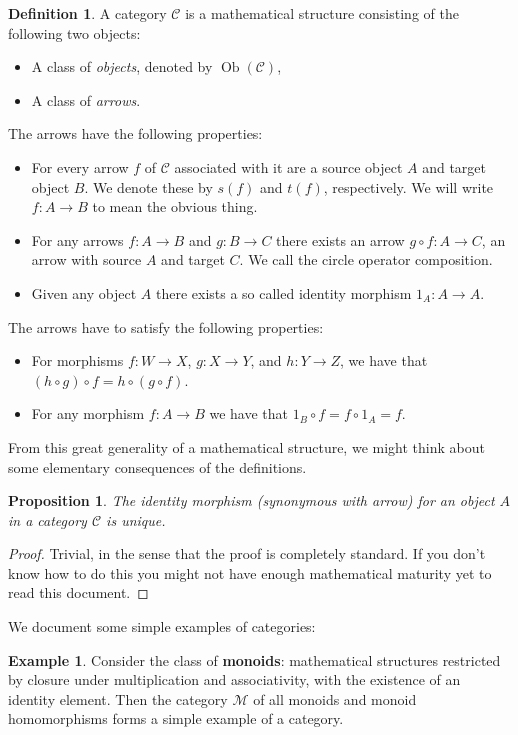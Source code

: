 \documentclass[12pt]{article}
\theoremstyle{plain}
\newtheorem{prop}{Proposition}
\theoremstyle{definition}
\newtheorem{defn}{Definition}
\newtheorem{example}{Example}
\newcommand{\Cc}{\mathcal{C}}
\newcommand{\Ob}{\operatorname{Ob}}
\begin{document}
\begin{defn}
A category $\Cc$ is a mathematical structure consisting of the following two objects:
\begin{itemize}
	\item A class of \textit{objects}, denoted by $\Ob(\Cc)$,
	\item A class of \textit{arrows}.
\end{itemize}

The arrows have the following properties:
\begin{itemize}
	\item For every arrow $f$ of $\Cc$ associated with it are a source object $A$ and target object $B$. We denote these by $s(f)$ and $t(f)$, respectively. We will write $f:A \to B$ to mean the obvious thing.
	\item For any arrows $f:A \to B$ and $g: B \to C$ there exists an arrow $g \circ f: A \to C$, an arrow with source $A$ and target $C$. We call the circle operator composition.
	\item Given any object $A$ there exists a so called identity morphism $1_A: A \to A$.
\end{itemize}

The arrows have to satisfy the following properties:
\begin{itemize}
	\item For morphisms $f:W \to X$, $g: X \to Y$, and $h: Y \to Z$, we have that $(h \circ g) \circ f = h \circ (g \circ f)$.
	\item For any morphism $f: A \to B$ we have that $1_B \circ f = f \circ 1_A = f$.
\end{itemize}
\end{defn}

From this great generality of a mathematical structure, we might think about some elementary consequences of the definitions.
\begin{prop}
	The identity morphism (synonymous with arrow) for an object $A$ in a category $\Cc$ is unique.
\end{prop}
\begin{proof}
Trivial, in the sense that the proof is completely standard. If you don't know how to do this you might not have enough mathematical maturity yet to read this document.
\end{proof}

We document some simple examples of categories:

\begin{example}
Consider the class of \textbf{monoids}: mathematical structures restricted by closure under multiplication and associativity, with the existence of an identity element. Then the category $\mathcal{M}$ of all monoids and monoid homomorphisms forms a simple example of a category.
\end{example}
\end{document}
